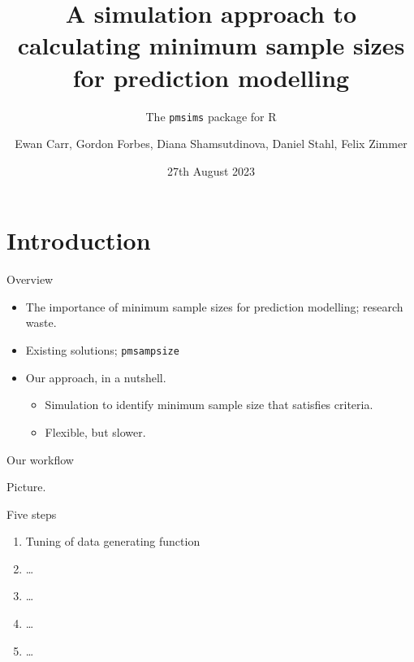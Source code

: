 \documentclass[11pt]{beamer}
\title{A simulation approach to calculating minimum sample sizes for prediction modelling}
\subtitle{The \texttt{pmsims} package for R}
\date{27th August 2023}
\author{Ewan Carr, Gordon Forbes, Diana Shamsutdinova, Daniel Stahl, Felix Zimmer}
\institute{Department of Biostatistics \& Health Informatics\\ King's College London}
\begin{document}
\maketitle

\section{Introduction}

\begin{frame}{Overview}

\begin{itemize}
    \item The importance of minimum sample sizes for prediction modelling; research waste.
    \item Existing solutions; \texttt{pmsampsize}
    \item Our approach, in a nutshell.
    \begin{itemize}
        \item Simulation to identify minimum sample size that satisfies criteria.
        \item Flexible, but slower.
    \end{itemize}
\end{itemize}
    
\end{frame}

\begin{frame}{Our workflow}

    Picture.
    
\end{frame}

\begin{frame}{Five steps}
    \begin{enumerate}
        \item Tuning of data generating function
        \item \ldots
        \item \ldots
        \item \ldots
        \item \ldots
    \end{enumerate}
\end{frame}
\end{document}
